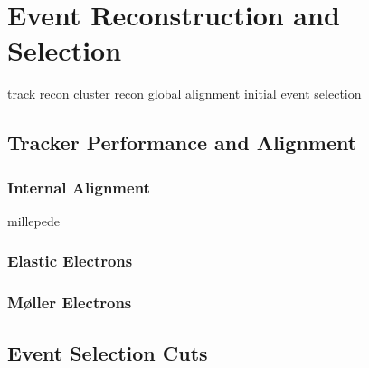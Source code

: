 \chapter{Event Reconstruction and Selection}
track recon
cluster recon
global alignment
initial event selection

\section{Tracker Performance and Alignment}
\subsection{Internal Alignment}
millepede
\subsection{Elastic Electrons}
\subsection{M{\o}ller Electrons}
\label{sec:mollers}

\section{Event Selection Cuts}
\label{sec:event_selection}
